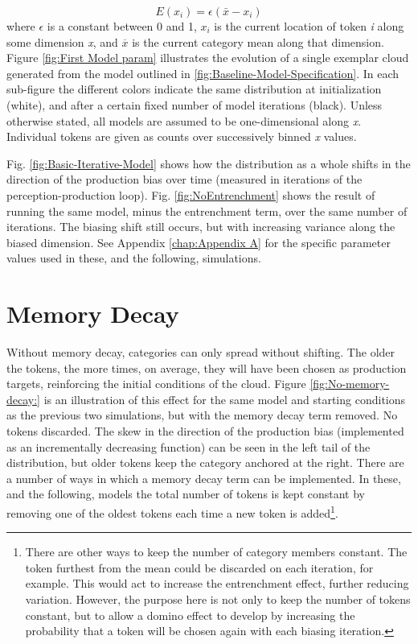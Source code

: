 \begin{equation}
E(x_{i})=\epsilon(\bar{x}-x_{i})\label{eq:Entrenchment}
\end{equation}
where $\epsilon$ is a constant between 0 and 1, $x_{i}$ is the current
location of token \emph{i} along some dimension \emph{x}, and $\overline{x}$
is the current category mean along that dimension. Figure \ref{fig:First Model param}
illustrates the evolution of a single exemplar cloud generated from
the model outlined in \ref{fig:Baseline-Model-Specification}. In
each sub-figure the different colors indicate the same distribution
at initialization (white), and after a certain fixed number of model
iterations (black). Unless otherwise stated, all models are assumed
to be one-dimensional along \emph{x}. Individual tokens are given
as counts over successively binned \emph{x} values. 

Fig. \ref{fig:Basic-Iterative-Model} shows how the distribution as
a whole shifts in the direction of the production bias over time (measured
in iterations of the perception-production loop). Fig. \ref{fig:NoEntrenchment}
shows the result of running the same model, minus the entrenchment
term, over the same number of iterations. The biasing shift still
occurs, but with increasing variance along the biased dimension. See
Appendix \ref{chap:Appendix A} for the specific parameter values
used in these, and the following, simulations. 

\section{Memory Decay}

Without memory decay, categories can only spread without shifting.
The older the tokens, the more times, on average, they will have been
chosen as production targets, reinforcing the initial conditions of
the cloud. Figure \ref{fig:No-memory-decay:} is an illustration of
this effect for the same model and starting conditions as the previous
two simulations, but with the memory decay term removed. No tokens
discarded. The skew in the direction of the production bias (implemented
as an incrementally decreasing function) can be seen in the left tail
of the distribution, but older tokens keep the category anchored at
the right. There are a number of ways in which a memory decay term
can be implemented. In these, and the following, models the total
number of tokens is kept constant by removing one of the oldest tokens
each time a new token is added\footnote{There are other ways to keep the number of category members constant.
The token furthest from the mean could be discarded on each iteration,
for example. This would act to increase the entrenchment effect, further
reducing variation. However, the purpose here is not only to keep
the number of tokens constant, but to allow a domino effect to develop
by increasing the probability that a token will be chosen again with
each biasing iteration. }.

